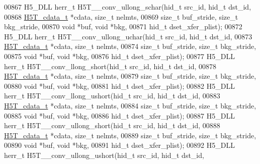 \begin{DoxyCode}
00867 H5\_DLL herr\_t H5T\_\_conv\_ullong\_schar(hid\_t src\_id, hid\_t dst\_id,
00868                      \hyperlink{struct_h5_t__cdata__t}{H5T\_cdata\_t} *cdata, \textcolor{keywordtype}{size\_t} nelmts,
00869                      \textcolor{keywordtype}{size\_t} buf\_stride, \textcolor{keywordtype}{size\_t} bkg\_stride,
00870                                      \textcolor{keywordtype}{void} *buf, \textcolor{keywordtype}{void} *bkg,
00871                                      hid\_t dset\_xfer\_plist);
00872 H5\_DLL herr\_t H5T\_\_conv\_ullong\_uchar(hid\_t src\_id, hid\_t dst\_id,
00873                      \hyperlink{struct_h5_t__cdata__t}{H5T\_cdata\_t} *cdata, \textcolor{keywordtype}{size\_t} nelmts,
00874                      \textcolor{keywordtype}{size\_t} buf\_stride, \textcolor{keywordtype}{size\_t} bkg\_stride,
00875                                      \textcolor{keywordtype}{void} *buf, \textcolor{keywordtype}{void} *bkg,
00876                                      hid\_t dset\_xfer\_plist);
00877 H5\_DLL herr\_t H5T\_\_conv\_llong\_short(hid\_t src\_id, hid\_t dst\_id,
00878                     \hyperlink{struct_h5_t__cdata__t}{H5T\_cdata\_t} *cdata, \textcolor{keywordtype}{size\_t} nelmts,
00879                     \textcolor{keywordtype}{size\_t} buf\_stride, \textcolor{keywordtype}{size\_t} bkg\_stride,
00880                                     \textcolor{keywordtype}{void} *buf, \textcolor{keywordtype}{void} *bkg,
00881                                     hid\_t dset\_xfer\_plist);
00882 H5\_DLL herr\_t H5T\_\_conv\_llong\_ushort(hid\_t src\_id, hid\_t dst\_id,
00883                      \hyperlink{struct_h5_t__cdata__t}{H5T\_cdata\_t} *cdata, \textcolor{keywordtype}{size\_t} nelmts,
00884                      \textcolor{keywordtype}{size\_t} buf\_stride, \textcolor{keywordtype}{size\_t} bkg\_stride,
00885                                      \textcolor{keywordtype}{void} *buf, \textcolor{keywordtype}{void} *bkg,
00886                                      hid\_t dset\_xfer\_plist);
00887 H5\_DLL herr\_t H5T\_\_conv\_ullong\_short(hid\_t src\_id, hid\_t dst\_id,
00888                      \hyperlink{struct_h5_t__cdata__t}{H5T\_cdata\_t} *cdata, \textcolor{keywordtype}{size\_t} nelmts,
00889                      \textcolor{keywordtype}{size\_t} buf\_stride, \textcolor{keywordtype}{size\_t} bkg\_stride,
00890                                      \textcolor{keywordtype}{void} *buf, \textcolor{keywordtype}{void} *bkg,
00891                                      hid\_t dset\_xfer\_plist);
00892 H5\_DLL herr\_t H5T\_\_conv\_ullong\_ushort(hid\_t src\_id, hid\_t dst\_id,

\end{DoxyCode}
